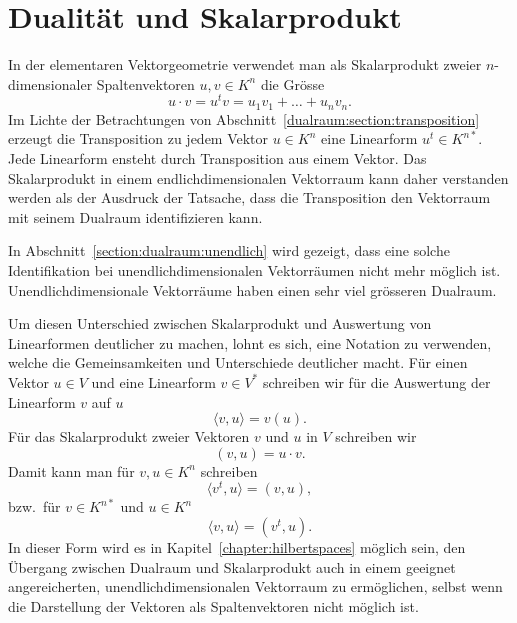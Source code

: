 %
%
%
\section{Dualität und Skalarprodukt}
In der elementaren Vektorgeometrie verwendet man als Skalarprodukt
zweier $n$-dimensionaler Spaltenvektoren $u,v\in K^n$ die Grösse
\[
u\cdot v
=
u^t v
=
u_1v_1+\dots+u_nv_n.
\]
Im Lichte der Betrachtungen von Abschnitt~\ref{dualraum:section:transposition}
erzeugt die Transposition zu jedem Vektor $u\in K^n$ eine Linearform
$u^t\in K^{n*}$.
Jede Linearform ensteht durch Transposition aus einem Vektor.
Das Skalarprodukt in einem endlichdimensionalen Vektorraum kann 
daher verstanden werden als der Ausdruck der Tatsache, dass die
Transposition den Vektorraum mit seinem Dualraum identifizieren kann.

In Abschnitt~\ref{section:dualraum:unendlich} wird gezeigt, dass
eine solche Identifikation bei unendlichdimensionalen Vektorräumen
nicht mehr möglich ist.
Unendlichdimensionale Vektorräume haben einen sehr viel grösseren Dualraum.

Um diesen Unterschied zwischen Skalarprodukt und Auswertung von Linearformen
deutlicher zu machen, lohnt es sich, eine Notation zu verwenden, welche
die Gemeinsamkeiten und Unterschiede deutlicher macht.
Für einen Vektor $u\in V$ und eine Linearform $v\in  V^*$ schreiben
wir für die Auswertung der Linearform $v$ auf $u$
\[
\langle v,u\rangle = v(u).
\]
Für das Skalarprodukt zweier Vektoren $v$ und $u$ in $V$  schreiben wir
\[
(v,u) = u\cdot v.
\]
Damit kann man für $v,u\in K^n$ schreiben
\[
\langle v^t,u\rangle = (v,u),
\]
bzw.~für $v\in K^{n*}$ und $u\in K^n$
\[
\langle v, u\rangle
=
(v^t,u).
\]
In dieser Form wird es in Kapitel~\ref{chapter:hilbertspaces}
möglich sein, den Übergang zwischen Dualraum
und Skalarprodukt auch in einem geeignet angereicherten,
unendlichdimensionalen Vektorraum
zu ermöglichen, selbst wenn die Darstellung der Vektoren als
Spaltenvektoren nicht möglich ist.

